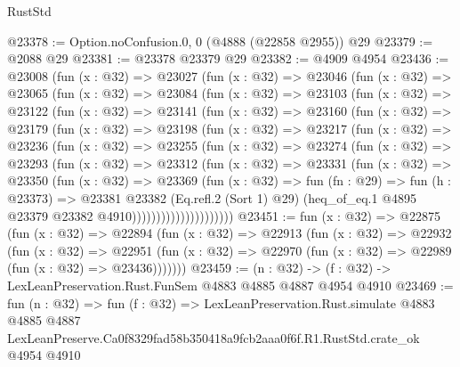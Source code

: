 \begin{lexlean}{RustStd}
\begin{coremodule}
@23378 := Option.noConfusion.{0, 0} (@4888 (@22858 @2955)) @29
@23379 := @2088 @29
@23381 := @23378 @23379 @29
@23382 := @4909 @4954
@23436 := @23008
    (fun (x : @32) =>
    @23027
      (fun (x : @32) =>
      @23046
        (fun (x : @32) =>
        @23065
          (fun (x : @32) =>
          @23084
            (fun (x : @32) =>
            @23103
              (fun (x : @32) =>
              @23122
                (fun (x : @32) =>
                @23141
                  (fun (x : @32) =>
                  @23160
                    (fun (x : @32) =>
                    @23179
                      (fun (x : @32) =>
                      @23198
                        (fun (x : @32) =>
                        @23217
                          (fun (x : @32) =>
                          @23236
                            (fun (x : @32) =>
                            @23255
                              (fun (x : @32) =>
                              @23274
                                (fun (x : @32) =>
                                @23293
                                  (fun (x : @32) =>
                                  @23312
                                    (fun (x : @32) =>
                                    @23331
                                      (fun (x : @32) =>
                                      @23350
                                        (fun (x : @32) =>
                                        @23369
                                          (fun (x : @32) =>
                                          fun (fn : @29) =>
                                          fun (h : @23373) =>
                                          @23381
                                            @23382
                                            (Eq.refl.{2} (Sort 1) @29)
                                            (heq_of_eq.{1}
                                              @4895
                                              @23379
                                              @23382
                                              @4910)))))))))))))))))))))
@23451 := fun (x : @32) =>
  @22875
    (fun (x : @32) =>
    @22894
      (fun (x : @32) =>
      @22913
        (fun (x : @32) =>
        @22932
          (fun (x : @32) =>
          @22951 (fun (x : @32) => @22970 (fun (x : @32) => @22989 (fun (x : @32) => @23436)))))))
@23459 := (n : @32) -> (f : @32) -> LexLeanPreservation.Rust.FunSem @4883 @4885 @4887 @4954 @4910
@23469 := fun (n : @32) =>
  fun (f : @32) =>
  LexLeanPreservation.Rust.simulate
    @4883
    @4885
    @4887
    LexLeanPreserve.Ca0f8329fad58b350418a9fcb2aaa0f6f.R1.RustStd.crate_ok
    @4954
    @4910
\end{coremodule}
\end{lexlean}
